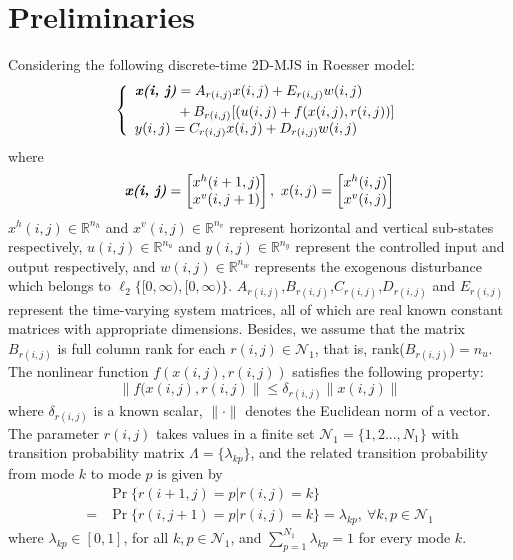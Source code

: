 \documentclass[conference]{IEEEtran}
\begin{document}
\section{Preliminaries} \label{priliminaries}
	Considering the following discrete-time 2D-MJS in Roesser model:
	\begin{equation} \label{system-equation}
	\left\{
		\begin{array}{lr}
			\begin{split}
				\emph{\textbf{x(i, j)}} &= A_{r(i,j)}x(i,j)+E_{r(i,j)}w(i,j)\\
										&+B_{r(i,j)}[(u(i,j)+f(x(i,j),r(i,j))]
			\end{split}\\
			\begin{split}
				y(i,j) = C_{r(i,j)}x(i,j)+D_{r(i,j)}w(i,j)
			\end{split}
		\end{array}
	\right.
	\end{equation}
	where
	\begin{equation*}
		\emph{\textbf{x(i, j)}} = \begin{bmatrix}
			x^{h}(i+1,j)\\
			x^{v}(i,j+1)
		\end{bmatrix}, \ 
		x(i, j) = \begin{bmatrix}
		x^{h}(i,j)\\
		x^{v}(i,j)
		\end{bmatrix}          
	\end{equation*}
	$x^{h}(i,j)\in \mathbb{R}^{n_h}$ and $x^{v}(i,j)\in \mathbb{R}^{n_v}$ represent horizontal and vertical sub-states respectively, $u(i,j) \in \mathbb{R}^{n_u}$ and $y(i,j) \in \mathbb{R}^{n_y}$ represent the controlled input and output respectively, and $w(i,j) \in \mathbb{R}^{n_w}$ represents the exogenous disturbance which belongs to $\ell_{2}\{[0,\infty),[0,\infty)\}$. $A_{r(i,j)}$,$B_{r(i,j)}$,$C_{r(i,j)}$,$D_{r(i,j)}$ and $E_{r(i,j)}$ represent the time-varying system matrices, all of which are real known constant matrices with appropriate dimensions. Besides, we assume that the matrix $B_{r(i,j)}$ is full column rank for each $r(i,j)\in\mathcal{N}_{1}$, that is, rank($B_{r(i,j)}$)$=n_u$. The nonlinear function $f(x(i,j),r(i,j))$ satisfies the following property:
	\begin{equation}\label{nonlinear-func}
		\|f(x(i,j),r(i,j)\| \leq \delta_{r(i,j)}\|x(i,j)\|
	\end{equation}
	where $\delta_{r(i,j)}$ is a known scalar, $\|\cdot\|$ denotes the Euclidean norm of a vector. The parameter $r(i,j)$ takes values in a finite set $\mathcal{N}_{1}=\{1,2...,N_{1} \}$ with transition probability matrix $\varLambda = \{\lambda_{kp}\}$, and the related transition probability from mode $k$ to mode $p$ is given by 
	\begin{equation}
		\begin{split}
			&\Pr\{r(i+1,j)=p|r(i,j)=k\}\\
		    =&\Pr\{r(i,j+1)=p|r(i,j)=k\}=\lambda_{kp},\  \forall k,p \in \mathcal{N}_{1}
		\end{split}
	\end{equation}
	where $\lambda_{kp}\in[0,1]$, for all $k, p\in\mathcal{N}_{1}$, and $\sum_{p=1}^{N_1}\lambda_{kp}=1$ for every mode $k$.
	
\end{document}
